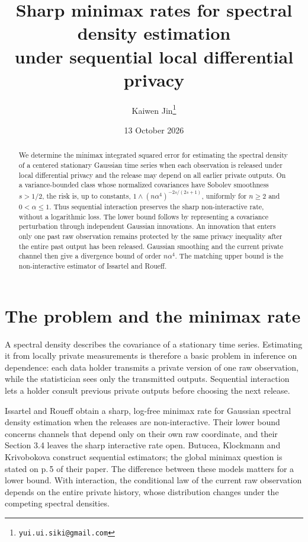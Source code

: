 \documentclass[11pt]{article}
\title{Sharp minimax rates for spectral density estimation\protect\\
under sequential local differential privacy}
\author{Kaiwen Jin\thanks{\texttt{yui.ui.siki@gmail.com}}}
\date{13 October 2026}
\theoremstyle{remark}
\begin{document}
\maketitle

\begin{abstract}
We determine the minimax integrated squared error for estimating the spectral
density of a centered stationary Gaussian time series when each observation
is released under local differential privacy and the release may depend on
all earlier private outputs. On a variance-bounded class whose normalized
covariances have Sobolev smoothness $s>1/2$, the risk is, up to constants,
$1\wedge(n\alpha^4)^{-2s/(2s+1)}$, uniformly for $n\ge2$ and
$0<\alpha\le1$. Thus sequential interaction preserves the sharp
non-interactive rate, without a logarithmic loss. The lower bound follows by
representing a covariance perturbation through independent Gaussian
innovations. An innovation that enters only one past raw observation remains
protected by the same privacy inequality after the entire past output has
been released. Gaussian smoothing and the current private channel then give
a divergence bound of order $n\alpha^4$. The matching upper bound is the
non-interactive estimator of Issartel and Roueff.
\end{abstract}

\section{The problem and the minimax rate}\label{sec:problem}

A spectral density describes the covariance of a stationary time series.
Estimating it from locally private measurements is therefore a basic problem
in inference on dependence: each data holder transmits a private version of
one raw observation, while the statistician sees only the transmitted outputs.
Sequential interaction lets a holder consult previous private outputs before
choosing the next release.

Issartel and Roueff \cite[Theorems 1 and 3]{IR} obtain a sharp, log-free
minimax rate for Gaussian spectral density estimation when the releases are
non-interactive. Their lower bound concerns channels that depend only on
their own raw coordinate, and their Section 3.4 leaves the sharp interactive
rate open. Butucea, Klockmann and Krivobokova \cite[Section 2.4]{BKK}
construct sequential estimators; the global minimax question is stated on
p.\,5 of their paper. The difference between these models matters for a
lower bound. With interaction, the conditional law of the current raw
observation depends on the entire private history, whose distribution changes
under the competing spectral densities.
\end{document}
